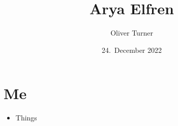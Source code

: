 \documentclass{article}
\date{24.~December 2022}
\begin{document}
\title{Arya Elfren}
\author{Oliver Turner}

\maketitle
\tableofcontents
\clearpage

\section{Me}

\begin{itemize}
\item Things
\end{itemize}
\end{document}

